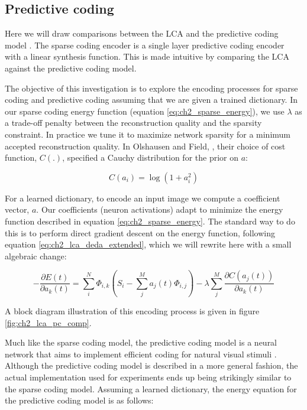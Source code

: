\subsection{Predictive coding}
Here we will draw comparisons between the LCA and the predictive coding model \parencite{rao1999predictive}. The sparse coding encoder is a single layer predictive coding encoder with a linear synthesis function. This is made intuitive by comparing the LCA against the predictive coding model.

The objective of this investigation is to explore the encoding processes for sparse coding and predictive coding assuming that we are given a trained dictionary. In our sparse coding energy function (equation \eqref{eq:ch2_sparse_energy}), we use $\lambda$ as a trade-off penalty between the reconstruction quality and the sparsity constraint. In practice we tune it to maximize network sparsity for a minimum accepted reconstruction quality. In Olshausen and Field, \citeyearpar{olshausen1997sparse}, their choice of cost function, $C(.)$, specified a Cauchy distribution for the prior on $a$:

\begin{equation}\label{eq:ch2_cauchy_cost}
  C(a_{i}) = \log(1+a_{i}^{2})
\end{equation}

For a learned dictionary, to encode an input image we compute a coefficient vector, $a$. Our coefficients (neuron activations) adapt to minimize the energy function described in equation \eqref{eq:ch2_sparse_energy}. The standard way to do this is to perform direct gradient descent on the energy function, following equation \eqref{eq:ch2_lca_deda_extended}, which we will rewrite here with a small algebraic change:

\begin{equation}\label{eq:ch2_sc_deda_rewrite}
    - \frac{\partial E(t)}{\partial a_{k}(t)}
    =
        \sum\limits_{i}^{N} \Phi_{i,k} \left(S_{i} - \sum\limits_{j}^{M}a_{j}(t) \Phi_{i,j}\right) -
        \lambda \sum\limits_{j}^{M}\frac{\partial C(a_{j}(t))}{\partial a_{k}(t)}
\end{equation}

A block diagram illustration of this encoding process is given in figure \ref{fig:ch2_lca_pc_comp}.

Much like the sparse coding model, the predictive coding model is a neural network that aims to implement efficient coding for natural visual stimuli \parencite{rao1997dynamic, rao1999predictive}. Although the predictive coding model is described in a more general fashion, the actual implementation used for experiments ends up being strikingly similar to the sparse coding model. Assuming a learned dictionary, the energy equation for the predictive coding model is as follows:


